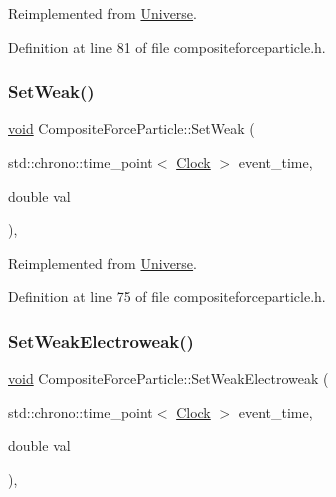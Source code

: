 Reimplemented from \mbox{\hyperlink{class_universe_a1b2d6197ddf3d613cc30bd04d22ed8b7}{Universe}}.



Definition at line 81 of file compositeforceparticle.\+h.

\mbox{\label{class_composite_force_particle_a7899a6efda98b062051e37c25c214e2a}} 
\subsubsection{\texorpdfstring{Set\+Weak()}{SetWeak()}}
{\footnotesize\ttfamily \mbox{\hyperlink{glad_8h_a950fc91edb4504f62f1c577bf4727c29}{void}} Composite\+Force\+Particle\+::\+Set\+Weak (\begin{DoxyParamCaption}\item[{std\+::chrono\+::time\+\_\+point$<$ \mbox{\hyperlink{universe_8h_a0ef8d951d1ca5ab3cfaf7ab4c7a6fd80}{Clock}} $>$}]{event\+\_\+time,  }\item[{double}]{val }\end{DoxyParamCaption})\hspace{0.3cm}{\ttfamily [inline]}, {\ttfamily [virtual]}}



Reimplemented from \mbox{\hyperlink{class_universe_a0f5cd04081b41ee931c0557dc397f6fb}{Universe}}.



Definition at line 75 of file compositeforceparticle.\+h.

\mbox{\label{class_composite_force_particle_a73a3792ae1c334e74f945fea56083f0b}} 
\subsubsection{\texorpdfstring{Set\+Weak\+Electroweak()}{SetWeakElectroweak()}}
{\footnotesize\ttfamily \mbox{\hyperlink{glad_8h_a950fc91edb4504f62f1c577bf4727c29}{void}} Composite\+Force\+Particle\+::\+Set\+Weak\+Electroweak (\begin{DoxyParamCaption}\item[{std\+::chrono\+::time\+\_\+point$<$ \mbox{\hyperlink{universe_8h_a0ef8d951d1ca5ab3cfaf7ab4c7a6fd80}{Clock}} $>$}]{event\+\_\+time,  }\item[{double}]{val }\end{DoxyParamCaption})\hspace{0.3cm}{\ttfamily [inline]}, {\ttfamily [virtual]}}




